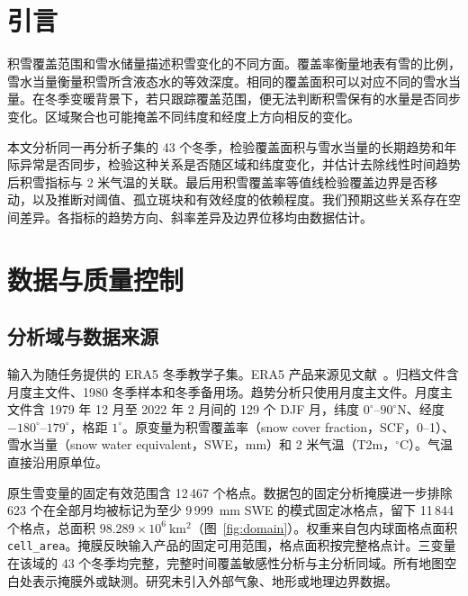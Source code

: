 \section{引言}

积雪覆盖范围和雪水储量描述积雪变化的不同方面。覆盖率衡量地表有雪的比例，雪水当量衡量积雪所含液态水的等效深度。相同的覆盖面积可以对应不同的雪水当量。在冬季变暖背景下，若只跟踪覆盖范围，便无法判断积雪保有的水量是否同步变化。区域聚合也可能掩盖不同纬度和经度上方向相反的变化。

本文分析同一再分析子集的 43 个冬季，检验覆盖面积与雪水当量的长期趋势和年际异常是否同步，检验这种关系是否随区域和纬度变化，并估计去除线性时间趋势后积雪指标与 2 米气温的关联。最后用积雪覆盖率等值线检验覆盖边界是否移动，以及推断对阈值、孤立斑块和有效经度的依赖程度。我们预期这些关系存在空间差异。各指标的趋势方向、斜率差异及边界位移均由数据估计。

\section{数据与质量控制}

\subsection{分析域与数据来源}

输入为随任务提供的 ERA5 冬季教学子集。ERA5 产品来源见文献~\cite{hersbach2020}。归档文件含月度主文件、1980 冬季样本和冬季备用场。趋势分析只使用月度主文件。月度主文件含 1979 年 12 月至 2022 年 2 月间的 129 个 DJF 月，纬度 $0^\circ$--$90^\circ$N、经度 $-180^\circ$--$179^\circ$，格距 $1^\circ$。原变量为积雪覆盖率（snow cover fraction，SCF，0--1）、雪水当量（snow water equivalent，SWE，mm）和 2 米气温（T2m，$^\circ$C）。气温直接沿用原单位。

原生雪变量的固定有效范围含 12\,467 个格点。数据包的固定分析掩膜进一步排除 623 个在全部月均被标记为至少 9\,999~mm SWE 的模式固定冰格点，留下 11\,844 个格点，总面积 $98.289\times 10^6~\mathrm{km^2}$（图~\ref{fig:domain}）。权重来自包内球面格点面积 \texttt{cell\_area}。掩膜反映输入产品的固定可用范围，格点面积按完整格点计。三变量在该域的 43 个冬季均完整，完整时间覆盖敏感性分析与主分析同域。所有地图空白处表示掩膜外或缺测。研究未引入外部气象、地形或地理边界数据。


